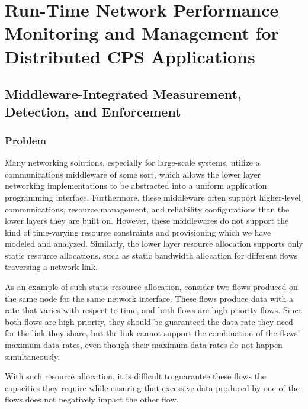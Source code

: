 \chapter{Run-Time Network Performance Monitoring and Management for Distributed CPS Applications}
\label{ch:runTime}

\section{Middleware-Integrated Measurement, Detection, and Enforcement}
\label{sec:middleware}

\subsection{Problem}
Many networking solutions, especially for large-scale systems, utilize
a communications middleware of some sort, which allows the lower layer
networking implementations to be abstracted into a uniform application
programming interface.  Furthermore, these middleware often support
higher-level communications, resource management, and reliability
configurations than the lower layers they are built on.  However,
these middlewares do not support the kind of time-varying resource
constraints and provisioning which we have modeled and analyzed.
Similarly, the lower layer resource allocation supports only static
resource allocations, such as static bandwidth allocation for
different flows traversing a network link.

As an example of such static resource allocation, consider two flows
produced on the same node for the same network interface.  These flows
produce data with a rate that varies with respect to time, and both
flows are high-priority flows.  Since both flows are high-priority,
they should be guaranteed the data rate they need for the link they
share, but the link cannot support the combination of the flows'
maximum data rates, even though their maximum data rates do not happen
simultaneously.

With such resource allocation, it is difficult to guarantee these flows
the capacities they require while ensuring that excessive data
produced by one of the flows does not negatively impact the other
flow.  

